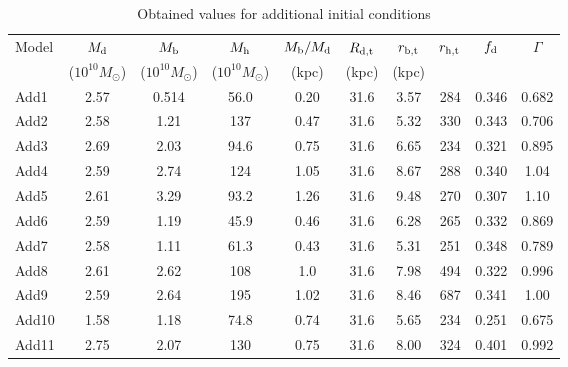 \begin{table*}
\begin{center}
\caption{Obtained values for additional initial conditions\label{tb:models_add2}}
\begin{tabular}{lccccccccc}
\hline
Model    & $M_{\rm d}$ & $M_{\rm b}$ & $M_{\rm h}$ & $M_{\rm b}/M_{\rm d}$& $R_{\rm d, t}$ & $r_{\rm b, t}$ & $r_{\rm h, t}$ & $f_{\rm d}$  &  $\Gamma$\\ 
   & ($10^{10}M_{\odot}$) & ($10^{10}M_{\odot}$) & ($10^{10}M_{\odot}$) & (kpc) & (kpc) & (kpc) &  &   &  \\ 
\hline  \hline
Add1 & 2.57 & 0.514 & 56.0 & 0.20 & 31.6 & 3.57 & 284 &  0.346 & 0.682 \\ %
Add2 & 2.58 & 1.21 & 137 & 0.47 & 31.6 & 5.32 & 330 & 0.343 & 0.706 \\ %
Add3 & 2.69 & 2.03 & 94.6 & 0.75 & 31.6 & 6.65 & 234 &  0.321 & 0.895 \\ %
Add4 & 2.59 & 2.74 & 124 & 1.05 & 31.6 & 8.67 & 288 &   0.340 & 1.04 \\ %
Add5 & 2.61 & 3.29 & 93.2 & 1.26 & 31.6 & 9.48 & 270 &  0.307 & 1.10 \\ %
Add6 & 2.59 & 1.19 & 45.9 & 0.46 & 31.6 & 6.28& 265 &  0.332 & 0.869 \\ %
Add7 & 2.58 & 1.11 & 61.3 & 0.43 & 31.6 & 5.31 & 251 & 0.348  & 0.789 \\ %
Add8 & 2.61 & 2.62 & 108 & 1.0 & 31.6 & 7.98 & 494 &  0.322 &  0.996\\ %
Add9 & 2.59 & 2.64 & 195 & 1.02 & 31.6 & 8.46 & 687 &  0.341 & 1.00 \\  %
Add10 & 1.58 & 1.18 & 74.8 & 0.74 & 31.6 & 5.65 & 234 &  0.251  & 0.675 \\ %
Add11 & 2.75 & 2.07 & 130 & 0.75 & 31.6 & 8.00 & 324 &  0.401 & 0.992 \\ %
\hline
\end{tabular}
\end{center}
\medskip
\end{table*}


